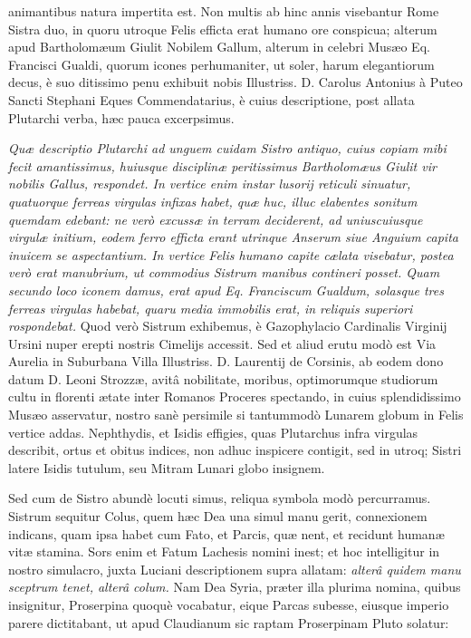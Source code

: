 \documentclass[a4paper, 11pt, oneside, polutonikogreek, latin]{article}
\begin{document}
animantibus natura impertita est. Non multis ab hinc annis visebantur Rome Sistra duo, in quoru utroque Felis efficta erat humano ore conspicua; alterum apud Bartholomæum Giulit Nobilem Gallum, alterum in celebri Musæo Eq. Francisci Gualdi, quorum icones perhumaniter, ut soler, harum elegantiorum decus, è suo ditissimo penu exhibuit nobis Illustriss. D. Carolus Antonius à Puteo Sancti Stephani Eques Commendatarius, è cuius descriptione, post allata Plutarchi verba, hæc pauca excerpsimus.

\emph{Quæ descriptio Plutarchi ad unguem cuidam Sistro antiquo, cuius copiam mibi fecit amantissimus, huiusque disciplinæ peritissimus Bartholomæus Giulit vir nobilis Gallus, respondet. In vertice enim instar lusorij reticuli sinuatur, quatuorque ferreas virgulas infixas habet, quæ huc, illuc elabentes sonitum quemdam edebant: ne verò excussæ in terram deciderent, ad uniuscuiusque virgulæ initium, eodem ferro efficta erant utrinque Anserum siue Anguium capita inuicem se aspectantium. In vertice Felis humano capite cælata visebatur, postea verò erat manubrium, ut commodius Sistrum manibus contineri posset. Quam secundo loco iconem damus, erat apud Eq. Franciscum Gualdum, solasque tres ferreas virgulas habebat, quaru media immobilis erat, in reliquis superiori rospondebat.} Quod verò Sistrum exhibemus, è Gazophylacio Cardinalis Virginij Ursini nuper erepti nostris Cimelijs accessit. Sed et aliud erutu modò est Via Aurelia in Suburbana Villa Illustriss. D. Laurentij de Corsinis, ab eodem dono datum D. Leoni Strozzæ, avitâ nobilitate, moribus, optimorumque studiorum cultu in florenti ætate inter Romanos Proceres spectando, in cuius splendidissimo Musæo asservatur, nostro sanè persimile si tantummodò Lunarem globum in Felis vertice addas. Nephthydis, et Isidis effigies, quas Plutarchus infra virgulas describit, ortus et obitus indices, non adhuc inspicere contigit, sed in utroq; Sistri latere Isidis tutulum, seu Mitram Lunari globo insignem.

Sed cum de Sistro abundè locuti simus, reliqua symbola modò percurramus. Sistrum sequitur Colus, quem hæc Dea una simul manu gerit, connexionem indicans, quam ipsa habet cum Fato, et Parcis, quæ nent, et recidunt humanæ vitæ stamina. Sors enim et Fatum Lachesis nomini inest; et hoc intelligitur in nostro simulacro, juxta Luciani descriptionem supra allatam: \emph{alterâ quidem manu sceptrum tenet, alterâ colum.} Nam Dea Syria, præter illa plurima nomina, quibus insignitur, Proserpina quoquè vocabatur, eique Parcas subesse, eiusque imperio parere dictitabant, ut apud Claudianum sic raptam Proserpinam Pluto solatur:
\end{document}
